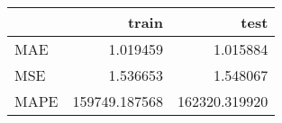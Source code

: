 \begin{tabular}{lrr}
\toprule
{} &          train &           test \\
\midrule
MAE  &       1.019459 &       1.015884 \\
MSE  &       1.536653 &       1.548067 \\
MAPE &  159749.187568 &  162320.319920 \\
\bottomrule
\end{tabular}
